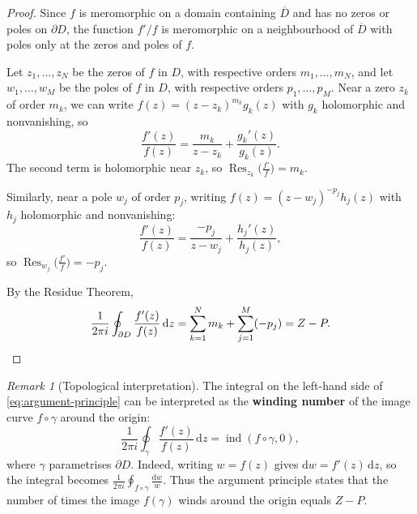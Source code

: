 \documentclass[12pt,a4paper,openany]{book}
\theoremstyle{definition}
\theoremstyle{plain}
\theoremstyle{remark}
\newtheorem{remark}[definition]{Remark}
\DeclareMathOperator{\Res}{Res}
\DeclareMathOperator{\ind}{ind}
\newcommand{\dd}{\mathrm{d}}
\begin{document}
\begin{proof}
Since $f$ is meromorphic on a domain containing $\overline{D}$ and
has no zeros or poles on $\partial D$, the function $f'/f$ is
meromorphic on a neighbourhood of $\overline{D}$ with poles only
at the zeros and poles of $f$.

Let $z_1, \ldots, z_N$ be the zeros of $f$ in $D$, with respective orders
$m_1, \ldots, m_N$, and let $w_1, \ldots, w_M$ be the poles of $f$ in $D$,
with respective orders $p_1, \ldots, p_M$. Near a zero $z_k$ of order $m_k$,
we can write $f(z) = (z - z_k)^{m_k} g_k(z)$ with $g_k$ holomorphic and nonvanishing, so
\[
  \frac{f'(z)}{f(z)} = \frac{m_k}{z - z_k} + \frac{g_k'(z)}{g_k(z)}.
\]
The second term is holomorphic near $z_k$, so
$\Res_{z_k}\!\bigl(\frac{f'}{f}\bigr) = m_k$.

Similarly, near a pole $w_j$ of order $p_j$, writing
$f(z) = (z - w_j)^{-p_j} h_j(z)$ with $h_j$ holomorphic and nonvanishing:
\[
  \frac{f'(z)}{f(z)} = \frac{-p_j}{z - w_j} + \frac{h_j'(z)}{h_j(z)},
\]
so $\Res_{w_j}\!\bigl(\frac{f'}{f}\bigr) = -p_j$.

By the Residue Theorem,
\[
  \frac{1}{2\pi i} \oint_{\partial D} \frac{f'(z)}{f(z)} \, \dd z
  = \sum_{k=1}^{N} m_k + \sum_{j=1}^{M} (-p_j) = Z - P. \qedhere
\]
\end{proof}

\begin{remark}[Topological interpretation]\label{rem:argument-principle-winding}
The integral on the left-hand side of \eqref{eq:argument-principle} can be
interpreted as the \textbf{winding number} of the
image curve $f \circ \gamma$ around the origin:
\[
  \frac{1}{2\pi i} \oint_{\gamma} \frac{f'(z)}{f(z)} \, \dd z
  = \ind(f \circ \gamma, 0),
\]
where $\gamma$ parametrises $\partial D$. Indeed, writing
$w = f(z)$ gives $\dd w = f'(z)\, \dd z$, so the integral becomes
$\frac{1}{2\pi i}\oint_{f \circ \gamma} \frac{\dd w}{w}$.
Thus the argument principle states that the number of times the image
$f(\gamma)$ winds around the origin equals $Z - P$.
\end{remark}

\medskip
\end{document}
